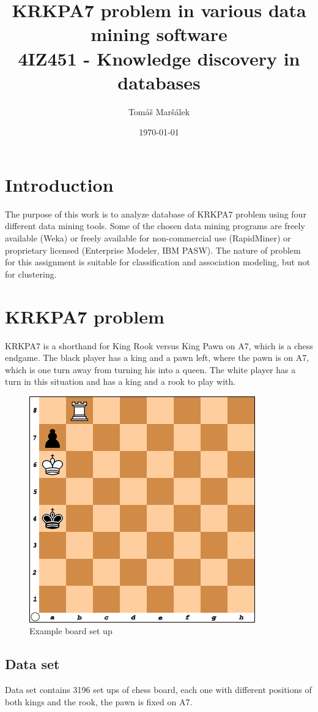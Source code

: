 \documentclass[11pt]{article}
\title{KRKPA7 problem in various data mining software \\ 4IZ451 - Knowledge discovery in databases}
\author{Tomáš Maršálek}
\date{\today}
\begin{document}
\maketitle
\thispagestyle{empty}
\clearpage

\section{Introduction}
The purpose of this work is to analyze database of KRKPA7 problem using four different data mining tools. Some of the chosen data mining programs are freely available (Weka) or freely available for non-commercial use (RapidMiner) or proprietary licensed (Enterprise Modeler, IBM PASW). %
The nature of problem for this assignment is suitable for classification and association modeling, but not for clustering.

\section{KRKPA7 problem}
KRKPA7 is a shorthand for King Rook versus King Pawn on A7, which is a chess endgame. The black player has a king and a pawn left, where the pawn is on A7, which is one turn away from turning his into a queen. The white player has a turn in this situation and has a king and a rook to play with.

\begin{figure}[!ht]
	\centering
	\includegraphics[width=.7\textwidth]{example}
	\caption{Example board set up}
\end{figure}

\clearpage

\subsection{Data set}
Data set contains 3196 set ups of chess board, each one with different positions of both kings and the rook, the pawn is fixed on A7.
\end{document}
